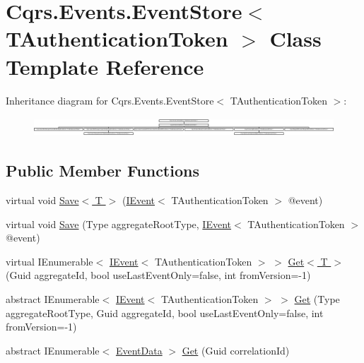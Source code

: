 \hypertarget{classCqrs_1_1Events_1_1EventStore}{}\section{Cqrs.\+Events.\+Event\+Store$<$ T\+Authentication\+Token $>$ Class Template Reference}
\label{classCqrs_1_1Events_1_1EventStore}
Inheritance diagram for Cqrs.\+Events.\+Event\+Store$<$ T\+Authentication\+Token $>$\+:\begin{figure}[H]
\begin{center}
\leavevmode
\includegraphics[height=0.719332cm]{classCqrs_1_1Events_1_1EventStore}
\end{center}
\end{figure}
\subsection*{Public Member Functions}
\begin{DoxyCompactItemize}
\item 
virtual void \hyperlink{classCqrs_1_1Events_1_1EventStore_a958854f49c3eb4fcf1922ba7737a8dfe_a958854f49c3eb4fcf1922ba7737a8dfe}{Save$<$ T $>$} (\hyperlink{interfaceCqrs_1_1Events_1_1IEvent}{I\+Event}$<$ T\+Authentication\+Token $>$ @event)
\item 
virtual void \hyperlink{classCqrs_1_1Events_1_1EventStore_a3ba5ba04a36382b6d36a6ad8867dc766_a3ba5ba04a36382b6d36a6ad8867dc766}{Save} (Type aggregate\+Root\+Type, \hyperlink{interfaceCqrs_1_1Events_1_1IEvent}{I\+Event}$<$ T\+Authentication\+Token $>$ @event)
\item 
virtual I\+Enumerable$<$ \hyperlink{interfaceCqrs_1_1Events_1_1IEvent}{I\+Event}$<$ T\+Authentication\+Token $>$ $>$ \hyperlink{classCqrs_1_1Events_1_1EventStore_aa6ffed5d7dd365600669149da29f9e89_aa6ffed5d7dd365600669149da29f9e89}{Get$<$ T $>$} (Guid aggregate\+Id, bool use\+Last\+Event\+Only=false, int from\+Version=-\/1)
\item 
abstract I\+Enumerable$<$ \hyperlink{interfaceCqrs_1_1Events_1_1IEvent}{I\+Event}$<$ T\+Authentication\+Token $>$ $>$ \hyperlink{classCqrs_1_1Events_1_1EventStore_aa1d0d399a35c1e3b0759e27202695d8b_aa1d0d399a35c1e3b0759e27202695d8b}{Get} (Type aggregate\+Root\+Type, Guid aggregate\+Id, bool use\+Last\+Event\+Only=false, int from\+Version=-\/1)
\item 
abstract I\+Enumerable$<$ \hyperlink{classCqrs_1_1Events_1_1EventData}{Event\+Data} $>$ \hyperlink{classCqrs_1_1Events_1_1EventStore_a0096646f5dff730b0041b9469719c420_a0096646f5dff730b0041b9469719c420}{Get} (Guid correlation\+Id)
\end{DoxyCompactItemize}
